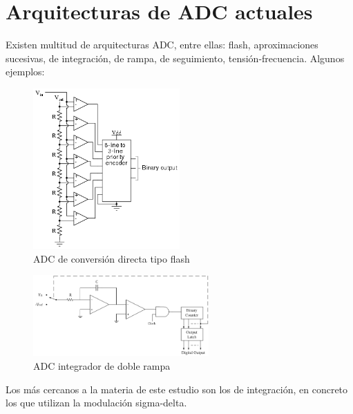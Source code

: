 \documentclass[12pt]{report} %
\begin{document}
	\section{Arquitecturas de ADC actuales}
	
	Existen multitud de arquitecturas ADC, entre ellas: flash, aproximaciones sucesivas, de integración, de rampa, de seguimiento, tensión-frecuencia. Algunos ejemplos:
	
	\begin{figure}[H]
		\includegraphics[width=0.5\textwidth]{flash-adc.png}
		\caption[ADC de conversión directa tipo flash]{ADC de conversión directa tipo flash\protect\footnotemark}
		\label{fig:flash-adc.png}
	\end{figure}
	\begin{figure}[H]
		\includegraphics[width=0.6\textwidth]{integrator-adc-double-ramp.png}
		\caption[ADC integrador de doble rampa]{ADC integrador de doble rampa\protect\footnotemark}
		\label{fig:integrator-adc-double-ramp.png}
	\end{figure}
	
	Los más cercanos a la materia de este estudio son los de integración, en concreto los que utilizan la modulación sigma-delta.
	
\end{document}
